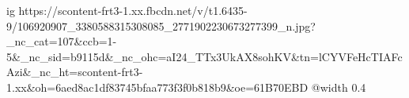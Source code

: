  
 
 
 
 

\ifcmt
  ig https://scontent-frt3-1.xx.fbcdn.net/v/t1.6435-9/106920907_3380588315308085_2771902230673277399_n.jpg?_nc_cat=107&ccb=1-5&_nc_sid=b9115d&_nc_ohc=aI24_TTx3UkAX8sohKV&tn=lCYVFeHcTIAFcAzi&_nc_ht=scontent-frt3-1.xx&oh=6aed8ac1df83745bfaa773f3f0b818b9&oe=61B70EBD
  @width 0.4
\fi
